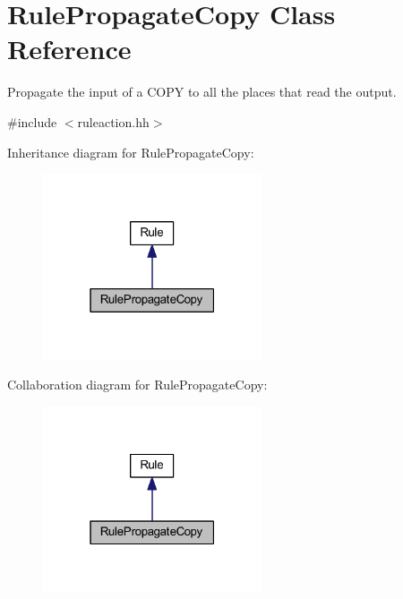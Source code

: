 \hypertarget{class_rule_propagate_copy}{}\section{Rule\+Propagate\+Copy Class Reference}
\label{class_rule_propagate_copy}


Propagate the input of a C\+O\+PY to all the places that read the output.  




{\ttfamily \#include $<$ruleaction.\+hh$>$}



Inheritance diagram for Rule\+Propagate\+Copy\+:
\nopagebreak
\begin{figure}[H]
\begin{center}
\leavevmode
\includegraphics[width=183pt]{class_rule_propagate_copy__inherit__graph}
\end{center}
\end{figure}


Collaboration diagram for Rule\+Propagate\+Copy\+:
\nopagebreak
\begin{figure}[H]
\begin{center}
\leavevmode
\includegraphics[width=183pt]{class_rule_propagate_copy__coll__graph}
\end{center}
\end{figure}
